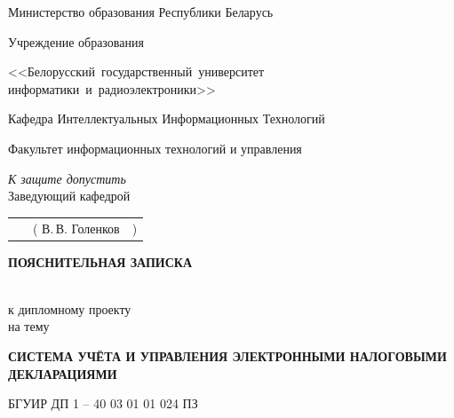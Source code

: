 \documentclass[14pt,a4paper]{reportmod}
\begin{document}
\thispagestyle{empty}
\begin{titlepage}
\begin{center}
Министерство образования Республики Беларусь

\vspace{0.6cm}

Учреждение образования

<<Белорусский~государственный~университет информатики~и~радиоэлектроники>>

\vspace{0.6cm}

Кафедра Интеллектуальных Информационных Технологий

\vspace{0.6cm}

Факультет информационных технологий и управления

\begin{flushright}
 \textit{К защите допустить}\\
 Заведующий кафедрой
\end{flushright}

\begin{flushright}
\begin{tabular}{p{10.5cm}p{4cm}r}
 ~ & ( В.\,В. Голенков & )
\end{tabular}
\end{flushright}

\vspace{1cm}

\begin{Large}\textbf{ПОЯСНИТЕЛЬНАЯ ЗАПИСКА}\end{Large}\\
к дипломному проекту\\
на тему


\textbf{СИСТЕМА УЧЁТА И УПРАВЛЕНИЯ ЭЛЕКТРОННЫМИ НАЛОГОВЫМИ ДЕКЛАРАЦИЯМИ}

БГУИР ДП 1 -- 40 03 01 01 024 ПЗ
\end{center}


\vspace{0.6cm}


\end{titlepage}
\end{document}
